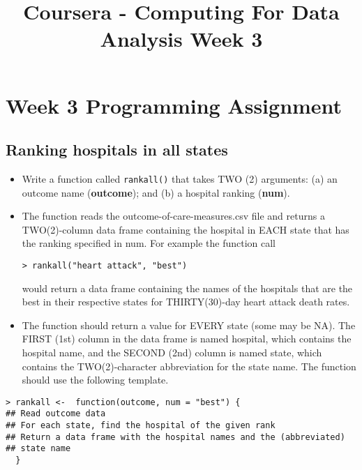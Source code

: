 \documentclass[]{article}
\title{Coursera - Computing For Data Analysis Week 3}
\begin{document}
\section{Week 3 Programming Assignment}
\subsection{Ranking hospitals in all states}

\begin{itemize}
\item Write a function called \texttt{rankall()} that takes TWO (2) arguments: (a) an outcome name (\textbf{outcome}); and (b) a hospital ranking (\textbf{num}). 

\item The function reads the outcome-of-care-measures.csv file and returns a TWO(2)-column data frame containing the hospital in EACH 
state that has the ranking specified in num.  For example the function call
\begin{verbatim}
> rankall("heart attack", "best")
\end{verbatim}
                                                     
would return a data frame containing the names of the hospitals that are the best in their respective states for THIRTY(30)-day 
heart attack death rates. 

\item The function should return a value for EVERY state (some may be NA). The FIRST (1st) column in the data 
frame is named hospital, which contains the hospital name, and the SECOND (2nd) column is named state, which contains the 
TWO(2)-character abbreviation for the state name. The function should use the following template.
\end{itemize}


\begin{framed}
\begin{verbatim}
> rankall <-  function(outcome, num = "best") {                                       
## Read outcome data                                                    
## For each state, find the hospital of the given rank                  
## Return a data frame with the hospital names and the (abbreviated)    
## state name                                                           
  }                          
\end{verbatim}
\end{framed}
\end{document}
